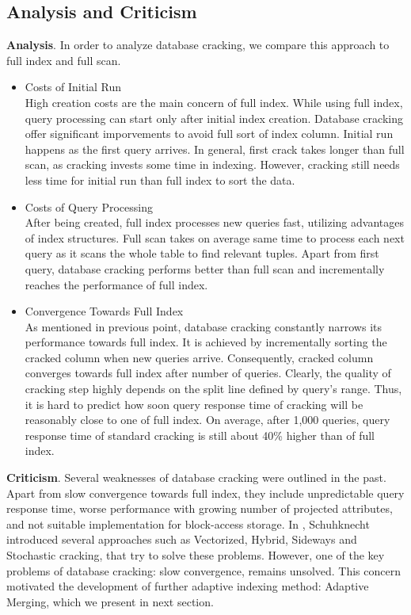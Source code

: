 \documentclass[10pt, conference, compsocconf]{IEEEtran}
\begin{document}
\subsection{Analysis and Criticism}
\textbf{Analysis}. In order to analyze database cracking, we compare this approach to full index and full scan.\\
\begin{itemize}
\item{Costs of Initial Run} \\High creation costs are the main concern of full index. While using full index, query processing can start only after initial index creation. Database cracking offer significant imporvements to avoid full sort of index column. Initial run happens as the first query arrives. In general, first crack takes longer than full scan, as cracking invests some time in indexing. However, cracking still needs less time for initial run than full index to sort the data.\\
\item{Costs of Query Processing} \\After being created, full index processes new queries fast, utilizing advantages of index structures. Full scan takes on average same time to process each next query as it scans the whole table to find relevant tuples. Apart from first query, database cracking performs better than full scan and incrementally reaches the performance of full index.\\
\item{Convergence Towards Full Index} \\As mentioned in previous point, database cracking constantly narrows its performance towards full index. It is achieved by incrementally sorting the cracked column when new queries arrive. Consequently, cracked column converges towards full index after number of queries. Clearly, the quality of cracking step highly depends on the split line defined by query's range. Thus, it is hard to predict how soon query response time of cracking will be reasonably close to one of full index. On average, after 1,000 queries, query response time of standard cracking is still about 40\% higher than of full index.\cite{survey_cracking}\\
\end{itemize}

\textbf{Criticism}. Several weaknesses of database cracking were outlined in the past. Apart from slow convergence towards full index, they include unpredictable query response time, worse performance with growing number of projected attributes, and not suitable implementation for block-access storage. In \cite{survey_cracking}, Schuhknecht introduced several approaches such as Vectorized, Hybrid, Sideways and Stochastic cracking, that try to solve these problems. However, one of the key problems of database cracking: slow convergence, remains unsolved. This concern motivated the development of further adaptive indexing method: Adaptive Merging, which we present in next section.
\end{document}

